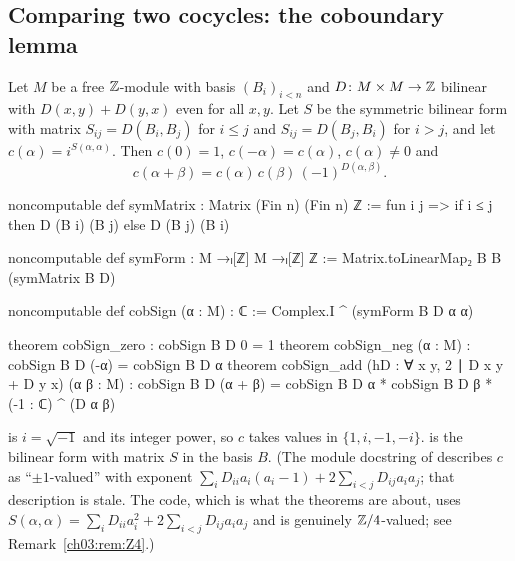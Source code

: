 \subsection{Comparing two cocycles: the coboundary lemma}

\begin{lemma}\label{ch03:lem:cobSign}
Let $M$ be a free ${\mathbb{Z}}$-module with basis $(B_i)_{i<n}$ and $D\colon M\times M\to{\mathbb{Z}}$ bilinear with
$D(x,y)+D(y,x)$ even for all $x,y$. Let $S$ be the symmetric bilinear form with matrix
$S_{ij}=D(B_i,B_j)$ for $i\le j$ and $S_{ij}=D(B_j,B_i)$ for $i>j$, and let
$c(\alpha)=i^{S(\alpha,\alpha)}$. Then $c(0)=1$, $c(-\alpha)=c(\alpha)$, $c(\alpha)\neq0$ and
\begin{equation}\label{ch03:eq:cob}
  c(\alpha+\beta)=c(\alpha)\,c(\beta)\,(-1)^{D(\alpha,\beta)} .
\end{equation}
\end{lemma}
\begin{leancode}
noncomputable def symMatrix : Matrix (Fin n) (Fin n) ℤ :=
  fun i j => if i ≤ j then D (B i) (B j) else D (B j) (B i)

noncomputable def symForm : M →ₗ[ℤ] M →ₗ[ℤ] ℤ := Matrix.toLinearMap₂ B B (symMatrix B D)

noncomputable def cobSign (α : M) : ℂ := Complex.I ^ (symForm B D α α)

theorem cobSign_zero : cobSign B D 0 = 1
theorem cobSign_neg (α : M) : cobSign B D (-α) = cobSign B D α
theorem cobSign_add (hD : ∀ x y, 2 ∣ D x y + D y x) (α β : M) :
    cobSign B D (α + β) = cobSign B D α * cobSign B D β * (-1 : ℂ) ^ (D α β)
\end{leancode}
\begin{dictionary}
 is $i=\sqrt{-1}$ and  its integer power, so $c$ takes
values in $\{1,i,-1,-i\}$.  is the bilinear form with matrix $S$
in the basis $B$. (The module docstring of  describes $c$ as
``$\pm1$-valued'' with exponent $\sum_iD_{ii}a_i(a_i-1)+2\sum_{i<j}D_{ij}a_ia_j$; that description is
stale. The code, which is what the theorems are about, uses $S(\alpha,\alpha)=\sum_iD_{ii}a_i^2+
2\sum_{i<j}D_{ij}a_ia_j$ and is genuinely ${\mathbb{Z}}/4$-valued; see Remark~\ref{ch03:rem:Z4}.)
\end{dictionary}

